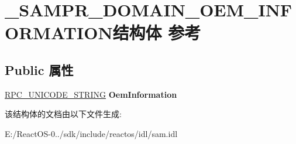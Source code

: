 \hypertarget{struct___s_a_m_p_r___d_o_m_a_i_n___o_e_m___i_n_f_o_r_m_a_t_i_o_n}{}\section{\+\_\+\+S\+A\+M\+P\+R\+\_\+\+D\+O\+M\+A\+I\+N\+\_\+\+O\+E\+M\+\_\+\+I\+N\+F\+O\+R\+M\+A\+T\+I\+O\+N结构体 参考}
\label{struct___s_a_m_p_r___d_o_m_a_i_n___o_e_m___i_n_f_o_r_m_a_t_i_o_n}
\subsection*{Public 属性}
\begin{DoxyCompactItemize}
\item 
\mbox{\label{struct___s_a_m_p_r___d_o_m_a_i_n___o_e_m___i_n_f_o_r_m_a_t_i_o_n_aacdeb9ac2b3b33218cca1319c2391bfd}} 
\hyperlink{struct___r_p_c___u_n_i_c_o_d_e___s_t_r_i_n_g}{R\+P\+C\+\_\+\+U\+N\+I\+C\+O\+D\+E\+\_\+\+S\+T\+R\+I\+NG} {\bfseries Oem\+Information}
\end{DoxyCompactItemize}


该结构体的文档由以下文件生成\+:\begin{DoxyCompactItemize}
\item 
E\+:/\+React\+O\+S-\/0../sdk/include/reactos/idl/sam.\+idl\end{DoxyCompactItemize}
